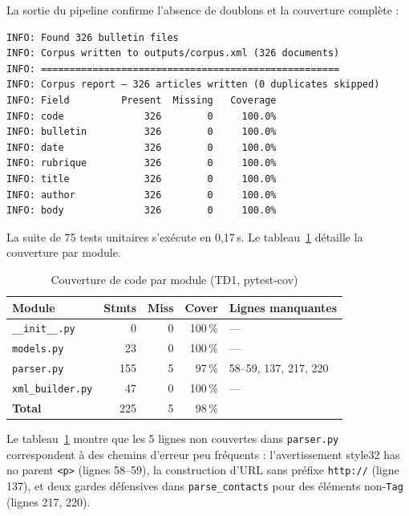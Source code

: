 La sortie du pipeline confirme l'absence de doublons et la couverture complète :

\begin{lstlisting}[language={}, basicstyle=\ttfamily\scriptsize,
  caption={Extrait du rapport de validation produit par \texttt{pipeline.py}},
  label={lst:pipeline_output}]
INFO: Found 326 bulletin files
INFO: Corpus written to outputs/corpus.xml (326 documents)
INFO: ====================================================
INFO: Corpus report — 326 articles written (0 duplicates skipped)
INFO: Field         Present  Missing   Coverage
INFO: code              326        0     100.0%
INFO: bulletin          326        0     100.0%
INFO: date              326        0     100.0%
INFO: rubrique          326        0     100.0%
INFO: title             326        0     100.0%
INFO: author            326        0     100.0%
INFO: body              326        0     100.0%
\end{lstlisting}

La suite de 75 tests unitaires s'exécute en 0,17\,s. Le tableau~\ref{tab:td1_coverage_code}
détaille la couverture par module.

\begin{table}[ht]
\centering
\caption{Couverture de code par module (TD1, pytest-cov)}
\label{tab:td1_coverage_code}
\begin{tabular}{lrrrl}
\toprule
\textbf{Module} & \textbf{Stmts} & \textbf{Miss} & \textbf{Cover} & \textbf{Lignes manquantes} \\
\midrule
\texttt{\_\_init\_\_.py}    &   0 &  0 & 100\,\% & — \\
\texttt{models.py}          &  23 &  0 & 100\,\% & — \\
\texttt{parser.py}          & 155 &  5 &  97\,\% & 58--59, 137, 217, 220 \\
\texttt{xml\_builder.py}    &  47 &  0 & 100\,\% & — \\
\midrule
\textbf{Total}              & 225 &  5 &  98\,\% & \\
\bottomrule
\end{tabular}
\end{table}

Le tableau~\ref{tab:td1_coverage_code} montre que les 5 lignes non couvertes dans
\texttt{parser.py} correspondent à des chemins d'erreur peu fréquents : l'avertissement
\og{}style32 has no parent \texttt{<p>}\fg{} (lignes 58--59), la construction d'URL sans
préfixe \texttt{http://} (ligne 137), et deux gardes défensives dans \texttt{parse\_contacts}
pour des éléments non-\texttt{Tag} (lignes 217, 220).

